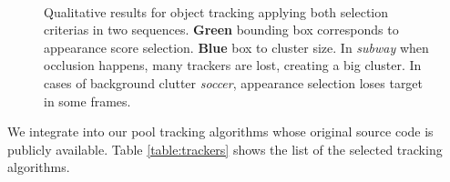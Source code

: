\begin{figure}[t!]
\centering
	 \\
\vspace{-2mm}
\caption{\small Qualitative results for object tracking applying both selection
	criterias in two sequences. \textbf{Green} bounding box corresponds to
	appearance score selection. \textbf{Blue} box to cluster size. In
	\textit{subway} when occlusion happens, many trackers are lost, creating a
	big cluster. In cases of background clutter \textit{soccer}, appearance
	selection loses target in some frames.}
\label{fig::clustvsapp}
\end{figure}

We integrate into our pool tracking algorithms whose original source code
is publicly available.
Table \ref{table:trackers} shows the list of the
selected tracking algorithms. 

